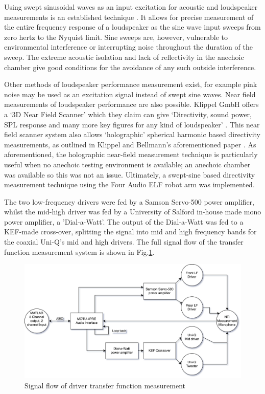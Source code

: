 \documentclass{report}
\begin{document}
        Using swept sinusoidal waves as an input excitation for acoustic and loudspeaker measurements is an established technique \cite{loudspeakersANSI}.
        It allows for precise measurement of the entire frequency response of a loudspeaker as the sine wave input sweeps from zero hertz to the Nyquist limit.
        Sine sweeps are, however, vulnerable to environmental interference or interrupting noise throughout the duration of the sweep.
        The extreme acoustic isolation and lack of reflectivity in the anechoic chamber give good conditions for the avoidance of any such outside interference.

        Other methods of loudspeaker performance measurement exist, for example pink noise may be used as an excitation signal instead of swept sine waves. 
        Near field measurements of loudspeaker performance are also possible.
        Klippel GmbH offers a `3D Near Field Scanner' which they claim can give `Directivity, sound power, SPL response and many more key figures for any kind of loudspeaker' \cite{klippelNFS}.
        This near field scanner system also allows `holographic' spherical harmonic based directivity measurements, as outlined in Klippel and Bellmann's aforementioned paper \cite{klippel2016holographic}. 
        As aforementioned, the holographic near-field measurement technique is particularly useful when no anechoic testing environment is available; an anechoic chamber was available so this was not an issue.
        Ultimately, a swept-sine based directivity measurement technique using the Four Audio ELF robot arm was implemented.

        The two low-frequency drivers were fed by a Samson Servo-500 power amplifier, whilst the mid-high driver was fed by a University of Salford in-house made mono power amplifier, a 'Dial-a-Watt'.
        The output of the Dial-a-Watt was fed to a KEF-made cross-over, splitting the signal into mid and high frequency bands for the coaxial Uni-Q's mid and high drivers.
        The full signal flow of the transfer function measurement system is shown in Fig.\ref{signalFlow}.
        
        \newpage
 
        \begin{figure}
            \centering
            \includegraphics[width = \textwidth]{figs/signalFlow.png}%
            \caption{Signal flow of driver transfer function measurement}
            \label{signalFlow}
        \end{figure}
\end{document}
